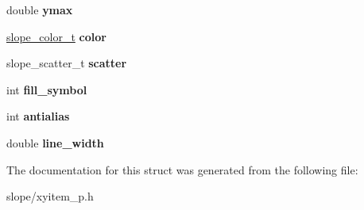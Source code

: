 \begin{DoxyCompactItemize}
\item 
\hypertarget{struct__slope__xyitem_a59b258bcde73db7e1246b2258fcb4cf4}{double {\bfseries ymax}}\label{struct__slope__xyitem_a59b258bcde73db7e1246b2258fcb4cf4}

\item 
\hypertarget{struct__slope__xyitem_a15d5849f6c2fea2fac75d483eabe198a}{\hyperlink{struct__slope__color}{slope\+\_\+color\+\_\+t} {\bfseries color}}\label{struct__slope__xyitem_a15d5849f6c2fea2fac75d483eabe198a}

\item 
\hypertarget{struct__slope__xyitem_afbec1ee0523a97e576b2a369d909c888}{slope\+\_\+scatter\+\_\+t {\bfseries scatter}}\label{struct__slope__xyitem_afbec1ee0523a97e576b2a369d909c888}

\item 
\hypertarget{struct__slope__xyitem_aa4f942a3bc1907d54158df9912cbfed6}{int {\bfseries fill\+\_\+symbol}}\label{struct__slope__xyitem_aa4f942a3bc1907d54158df9912cbfed6}

\item 
\hypertarget{struct__slope__xyitem_a809b4363b4fae543e0196983bcc99bd4}{int {\bfseries antialias}}\label{struct__slope__xyitem_a809b4363b4fae543e0196983bcc99bd4}

\item 
\hypertarget{struct__slope__xyitem_afa9758ee875e6c37ed250eb0d6cc4d4b}{double {\bfseries line\+\_\+width}}\label{struct__slope__xyitem_afa9758ee875e6c37ed250eb0d6cc4d4b}

\end{DoxyCompactItemize}


The documentation for this struct was generated from the following file\+:\begin{DoxyCompactItemize}
\item 
slope/xyitem\+\_\+p.\+h\end{DoxyCompactItemize}
